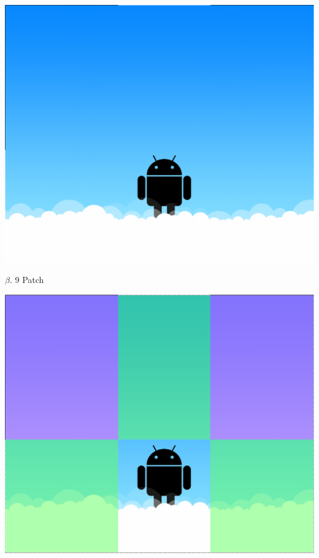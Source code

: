 \documentclass{article}
\begin{document}
\begin{center}

\includegraphics[scale=.23]{Marcianito.png} 

\end{center}

$\beta$. 9 Patch

\begin{center}

\includegraphics[scale=.3]{9patch.jpg} 

\end{center}
\end{document}
